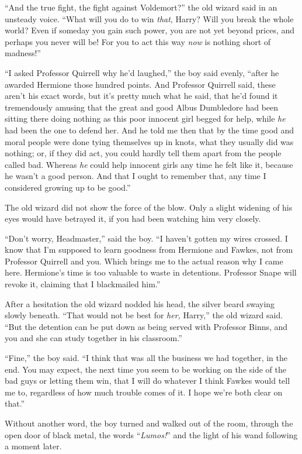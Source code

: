``And the true fight, the fight against Voldemort?'' the old wizard said in an unsteady voice. ``What will you do to win \emph{that}, Harry? Will you break the whole world? Even if someday you gain such power, you are not yet beyond prices, and perhaps you never will be! For you to act this way \emph{now} is nothing short of madness!''

``I asked Professor Quirrell why he'd laughed,'' the boy said evenly, ``after he awarded Hermione those hundred points. And Professor Quirrell said, these aren't his exact words, but it's pretty much what he said, that he'd found it tremendously amusing that the great and good Albus Dumbledore had been sitting there doing nothing as this poor innocent girl begged for help, while \emph{he} had been the one to defend her. And he told me then that by the time good and moral people were done tying themselves up in knots, what they usually did was nothing; or, if they did act, you could hardly tell them apart from the people called bad. Whereas \emph{he} could help innocent girls any time he felt like it, because he wasn't a good person. And that I ought to remember that, any time I considered growing up to be good.''

The old wizard did not show the force of the blow. Only a slight widening of his eyes would have betrayed it, if you had been watching him very closely.

``Don't worry, Headmaster,'' said the boy. ``I haven't gotten my wires crossed. I know that I'm supposed to learn goodness from Hermione and Fawkes, not from Professor Quirrell and you. Which brings me to the actual reason why I came here. Hermione's time is too valuable to waste in detentions. Professor Snape will revoke it, claiming that I blackmailed him.''

After a hesitation the old wizard nodded his head, the silver beard swaying slowly beneath. ``That would not be best for \emph{her,} Harry,'' the old wizard said. ``But the detention can be put down as being served with Professor Binns, and you and she can study together in his classroom.''

``Fine,'' the boy said. ``I think that was all the business we had together, in the end. You may expect, the next time you seem to be working on the side of the bad guys or letting them win, that I will do whatever I think Fawkes would tell me to, regardless of how much trouble comes of it. I hope we're both clear on that.''

Without another word, the boy turned and walked out of the room, through the open door of black metal, the words ``\emph{Lumos!}'' and the light of his wand following a moment later.

